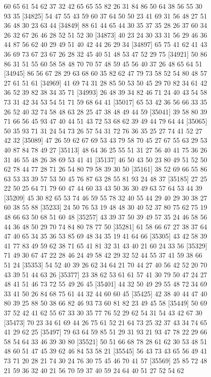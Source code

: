 \documentclass{article}
\begin{document}
\begin{figure}[H]
\begin{Schunk}
\begin{Soutput}
[34801] 60 65 61 54 62 37 32 42 65 65 55 82 26 31 84 86 50 64 38 56 55 30 93 35
[34825] 54 47 55 43 59 60 37 64 50 50 23 41 69 31 56 48 27 51 36 48 30 23 63 44
[34849] 88 61 44 65 44 30 35 37 35 28 26 37 60 34 26 32 67 26 46 28 52 51 52 30
[34873] 40 23 24 30 33 31 56 29 46 36 44 87 56 62 40 29 49 51 40 42 44 26 29 34
[34897] 65 75 41 62 41 43 36 69 73 67 23 67 26 28 32 45 40 51 48 53 47 52 29 75
[34921] 50 86 86 31 51 55 60 58 58 48 70 70 57 48 59 45 56 40 37 26 48 65 64 51
[34945] 86 56 67 28 29 63 68 60 35 82 62 47 79 73 58 52 54 80 48 57 27 61 51 61
[34969] 41 69 74 31 28 85 50 53 50 45 29 70 82 34 61 42 36 52 39 82 38 34 35 71
[34993] 26 48 39 34 82 46 71 24 40 43 54 58 73 31 42 34 53 54 51 71 59 68 64 41
[35017] 65 53 42 36 56 66 33 35 26 52 40 32 74 58 48 63 28 25 47 38 48 49 44 59
[35041] 39 58 80 39 71 66 56 45 93 47 40 44 51 43 72 53 68 62 39 49 44 79 64 44
[35065] 50 35 93 71 31 24 54 73 26 57 54 31 72 76 36 35 25 27 74 41 52 27 42 32
[35089] 47 26 59 62 67 69 53 43 79 58 70 45 27 67 55 63 29 53 40 87 84 78 49 27
[35113] 48 64 36 25 55 51 31 27 56 40 41 75 36 26 31 46 55 48 26 38 69 53 41 41
[35137] 46 50 43 50 23 80 49 51 52 50 62 78 44 77 28 71 26 54 80 79 58 39 30 50
[35161] 38 52 69 66 55 86 63 53 33 39 57 53 50 45 76 87 63 28 55 81 93 24 48 37
[35185] 27 25 22 50 25 64 71 79 60 47 44 60 33 43 50 36 30 49 63 57 64 53 44 39
[35209] 45 30 82 65 53 74 46 59 55 78 32 40 55 44 29 40 29 30 38 27 60 38 55 88
[35233] 24 50 76 53 19 48 48 30 40 52 37 80 75 62 75 19 48 66 63 50 68 51 60 48
[35257] 43 39 37 50 39 49 57 35 24 46 58 56 44 36 48 50 29 70 74 84 80 78 77 50
[35281] 61 58 66 67 27 38 37 64 47 40 65 34 35 36 53 85 69 48 34 35 19 41 64 66
[35305] 43 42 58 39 41 77 83 49 59 62 38 71 65 41 81 32 31 43 40 21 60 24 33 56
[35329] 71 49 30 67 47 22 28 46 24 49 58 42 29 32 52 44 55 37 41 59 38 66 51 24
[35353] 54 52 40 39 26 62 34 64 21 70 44 27 40 56 42 52 20 70 43 39 51 44 63 26
[35377] 23 38 62 53 61 61 57 41 30 79 50 47 24 27 48 41 51 46 73 72 55 49 26 45
[35401] 44 32 50 49 29 55 48 72 34 69 33 41 50 26 84 68 75 61 44 32 44 60 60 45
[35425] 42 38 40 44 47 40 80 39 25 88 50 38 66 82 46 93 73 60 81 82 23 49 45 58
[35449] 50 69 37 52 42 41 62 55 67 33 30 35 77 76 52 29 62 54 31 54 43 42 67 30
[35473] 70 23 34 61 69 44 26 75 61 52 21 64 73 25 32 37 43 34 74 65 41 29 62 25
[35497] 79 63 64 59 85 51 29 31 93 21 93 47 78 22 29 66 58 54 64 33 46 39 30 80
[35521] 50 51 66 68 78 28 61 62 30 53 48 51 48 60 51 47 45 39 62 46 84 53 58 21
[35545] 56 43 73 43 65 56 49 41 73 71 20 28 21 74 30 24 76 30 75 45 46 70 41 57
[35569] 25 85 72 48 21 59 36 32 40 21 56 70 59 37 40 59 24 64 40 51 27 52 54 62

\end{Soutput}
\end{Schunk}
\end{figure}
\end{document}
